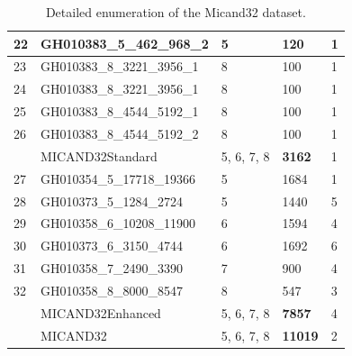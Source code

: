 \begin{table}[]
\begin{tabular}{|l|l|l|l|l|}
		22          & GH010383\_5\_462\_968\_2     & 5             & 120                                                         & 1                                                     \\ \hline
		23          & GH010383\_8\_3221\_3956\_1   & 8             & 100                                                         & 1                                                     \\ \hline
		24          & GH010383\_8\_3221\_3956\_1   & 8             & 100                                                         & 1                                                     \\ \hline
		25          & GH010383\_8\_4544\_5192\_1   & 8             & 100                                                         & 1                                                     \\ \hline
		26          & GH010383\_8\_4544\_5192\_2   & 8             & 100                                                         & 1                                                     \\ \hline
		& MICAND32Standard             & 5, 6, 7,   8  & \textbf{3162}                                               & 1                                                     \\ \hline
		27          & GH010354\_5\_17718\_19366    & 5             & 1684                                                        & 1                                                     \\ \hline
		28          & GH010373\_5\_1284\_2724      & 5             & 1440                                                        & 5                                                     \\ \hline
		29          & GH010358\_6\_10208\_11900    & 6             & 1594                                                        & 4                                                     \\ \hline
		30          & GH010373\_6\_3150\_4744      & 6             & 1692                                                        & 6                                                     \\ \hline
		31          & GH010358\_7\_2490\_3390      & 7             & 900                                                         & 4                                                     \\ \hline
		32          & GH010358\_8\_8000\_8547      & 8             & 547                                                         & 3                                                     \\ \hline
		& MICAND32Enhanced             & 5, 6, 7,   8  & \textbf{7857}                                               & 4                                                     \\ \hline
		& MICAND32                     & 5, 6, 7,   8  & \textbf{11019}                                              & 2                                                     \\ \hline
	\end{tabular}
\caption{Detailed enumeration of the Micand32 dataset.}
\end{table}
